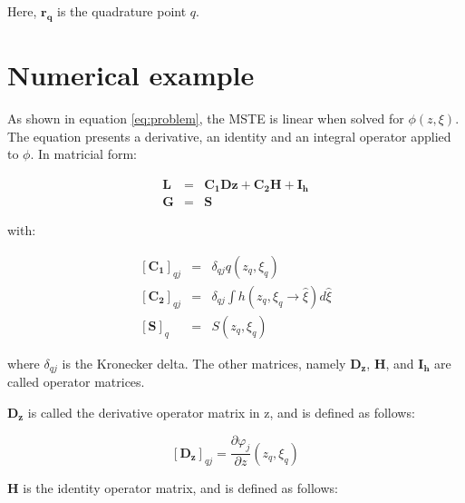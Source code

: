 \documentclass{CFD2011}
\newcommand{\Pablo}[1]{#1}
\begin{document}
Here, $\mathbf{r_q}$ is the quadrature point $q$.

\section{Numerical example}
%
%
As shown in equation \ref{eq:problem}, the MSTE is linear when solved for $\phi(z,\xi)$. 
The equation presents a derivative, an identity and an integral operator applied to $\phi$. In matricial form:

\begin{eqnarray}
\mathbf{L}&=&\mathbf{C_1}\mathbf{Dz}+\mathbf{C_2}\mathbf{H} \Pablo{+} \mathbf{I_h} \\
\mathbf{G}&=&\mathbf{S}
\end{eqnarray}

\noindent with:

\begin{eqnarray}
\left[\mathbf{C_1}\right]_{qj}&=& \delta_{qj}q(z_q,\xi_q) \nonumber \\
\left[\mathbf{C_2}\right]_{qj}&=& \delta_{qj}\int h(z_q,\xi_q\rightarrow\hat{\xi})d\hat{\xi} \nonumber \\
\left[\mathbf{S}\right]_{q}&=& S(z_q,\xi_q) \nonumber 
\end{eqnarray}

\noindent where $\delta_{qj}$ is the Kronecker delta. The other matrices, namely $\mathbf{D_z}$, $\mathbf{H}$, and $\mathbf{I_h}$ are called operator matrices.


$\mathbf{D_z}$ is called the derivative operator matrix in z, and is defined as follows:

\begin{equation}
\left[\mathbf{D_z}\right]_{qj}=\frac{\partial \varphi_j}{\partial z}(z_q,\xi_q)
\end{equation}

$\mathbf{H}$ is the identity operator matrix, and is defined as follows:
\end{document}

